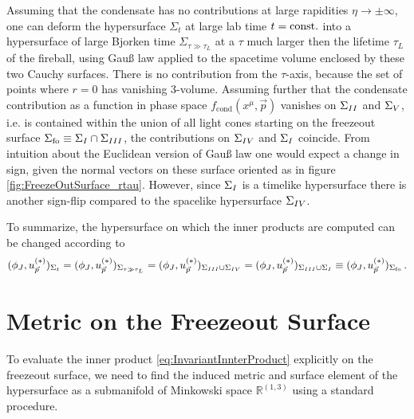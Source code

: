 Assuming that the condensate has no contributions at large rapidities ${\eta\to\pm\infty}$, one can deform the hypersurface $\Sigma_t$ at large lab time ${t={\text{const.}}}$ into a hypersurface of large Bjorken time $\Sigma_{\tau\gg\tau_L}$ at a $\tau$ much larger then the lifetime $\tau_L$ of the fireball, using Gauß law applied to the spacetime volume enclosed by these two Cauchy surfaces. There is no contribution from the $\tau$-axis, because the set of points where $r=0$ has vanishing 3-volume. Assuming further that the condensate contribution as a function in phase space $f_{\text{cond}}(x^\mu,\vec{p})$ vanishes on $\Sigma_{\rom{2}}$ and $\Sigma_{\rom{5}}$, i.e. is contained within the union of all light cones starting on the freezeout surface ${\Sigma_{\text{fo}}\equiv\Sigma_{\rom{1}}\cap\Sigma_{\rom{3}}}$, the contributions on $\Sigma_{\rom{4}}$ and $\Sigma_{\rom{1}}$ coincide. From intuition about the Euclidean version of Gauß law one would expect a change in sign, given the normal vectors on these surface oriented as in figure \ref{fig:FreezeOutSurface_rtau}. However, since $\Sigma_{\rom{1}}$ is a timelike hypersurface there is another sign-flip compared to the spacelike hypersurface $\Sigma_{\rom{4}}$.

To summarize, the hypersurface on which the inner products are computed can be changed according to
\begin{equation}
    (\phi_J,u_{\vec{p}}^{(*)})_{\Sigma_t}=(\phi_J,u_{\vec{p}}^{(*)})_{\Sigma_{\tau\gg\tau_L}}=(\phi_J,u_{\vec{p}}^{(*)})_{\Sigma_{\rom{3}}\cup\Sigma_{\rom{4}}}=(\phi_J,u_{\vec{p}}^{(*)})_{\Sigma_{\rom{3}}\cup\Sigma_{\rom{1}}}\equiv(\phi_J,u_{\vec{p}}^{(*)})_{\Sigma_{\text{fo}}}\,.
    \label{eq:InnerproductHypersurfaceDeformation}
\end{equation}

\section{Metric on the Freezeout Surface}
\label{sec:FOSurfaceMetric}

To evaluate the inner product \eqref{eq:InvariantInnterProduct} explicitly on the freezeout surface, we need to find the induced metric and surface element of the hypersurface as a submanifold of Minkowski space $\mathbb{R}^{(1,3)}$ using a standard procedure.

